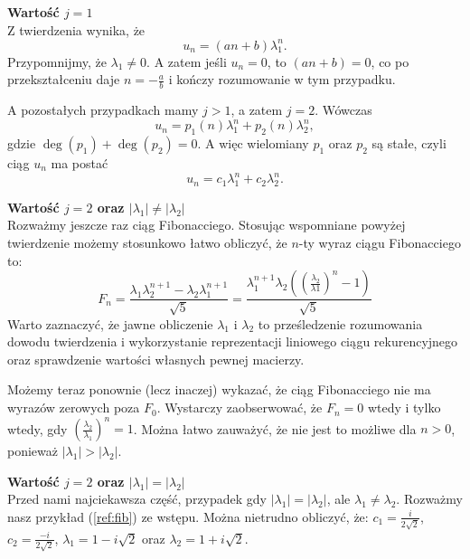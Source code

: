 \documentclass[leqno,10pt]{article}
\begin{document}
\textbf{Wartość $j=1$}\\
Z twierdzenia wynika, że
\[
u_n = (an+b) \lambda_1^n.
\]
Przypomnijmy, że $\lambda_1 \neq 0$.
A zatem jeśli $u_n = 0$, to $(an+b) = 0$, co po przekształceniu daje $n = -\frac{a}{b}$ i kończy rozumowanie w tym przypadku.

A pozostałych przypadkach mamy $j > 1$, a zatem $j = 2$. Wówczas
\[
u_n = p_1(n) \lambda_1^n + p_2(n) \lambda_2^n,
\]
gdzie $\deg(p_1) + \deg(p_2) = 0$. A więc wielomiany $p_1$ oraz $p_2$ są stałe, czyli ciąg $u_n$ ma postać
\[
u_n = c_1 \lambda_1^n + c_2 \lambda_2^n.
\]

\textbf{Wartość $j=2$ oraz $|\lambda_1| \neq |\lambda_2|$}\\
Rozważmy jeszcze raz ciąg Fibonacciego. Stosując wspomniane powyżej twierdzenie możemy stosunkowo łatwo obliczyć, że $n$-ty wyraz ciągu Fibonacciego to:
\begin{equation*}
    F_{n} = \frac{\lambda_1 \lambda_2^{n+1}-\lambda_2 \lambda_1^{n+1}}{\sqrt{5}} = \frac{\lambda_1^{n+1}\lambda_2\left(\left(\frac{\lambda_2}{\lambda1}\right)^{n}-1\right)}{\sqrt{5}}
\end{equation*}
Warto zaznaczyć, że jawne obliczenie $\lambda_1$ i $\lambda_2$ to prześledzenie rozumowania dowodu twierdzenia i wykorzystanie reprezentacji liniowego ciągu rekurencyjnego oraz sprawdzenie wartości własnych pewnej macierzy.  
 

Możemy teraz ponownie (lecz inaczej) wykazać, że ciąg Fibonacciego nie ma wyrazów zerowych poza $F_0$. Wystarczy zaobserwować, że $F_n = 0$ wtedy i tylko wtedy, gdy $(\frac{\lambda_2}{\lambda_1})^{n}=1$. Można łatwo zauważyć, że nie jest to możliwe dla $n > 0$, ponieważ $|\lambda_1| > |\lambda_2|$.




\textbf{Wartość $j=2$ oraz $|\lambda_1| = |\lambda_2|$}\\
Przed nami najciekawsza część, przypadek gdy $|\lambda_1| = |\lambda_2|$, ale $\lambda_1 \neq \lambda_2$.
Rozważmy nasz przykład (\ref{ref:fib}) ze wstępu. 
Można nietrudno obliczyć, że: $c_1 = \frac{i}{2\sqrt{2}}$, $c_2 = \frac{-i}{2\sqrt{2}}$, $\lambda_1 = 1 - i\sqrt{2}$ oraz $\lambda_2 = 1 + i \sqrt{2}$.
\end{document}
